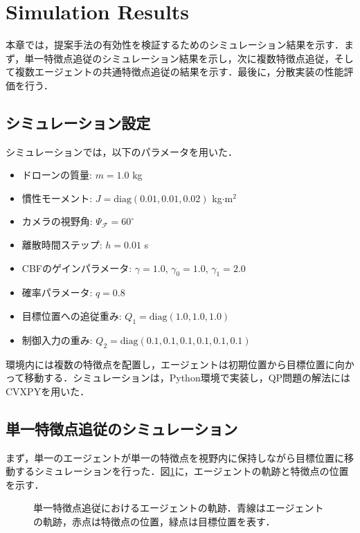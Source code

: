 \section{Simulation Results}

本章では，提案手法の有効性を検証するためのシミュレーション結果を示す．まず，単一特徴点追従のシミュレーション結果を示し，次に複数特徴点追従，そして複数エージェントの共通特徴点追従の結果を示す．最後に，分散実装の性能評価を行う．

\subsection{シミュレーション設定}

シミュレーションでは，以下のパラメータを用いた．
\begin{itemize}
    \item ドローンの質量: $m = 1.0$ kg
    \item 慣性モーメント: $J = \mathrm{diag}(0.01, 0.01, 0.02)$ kg$\cdot$m$^2$
    \item カメラの視野角: $\Psi_\mathcal{F} = 60^\circ$
    \item 離散時間ステップ: $h = 0.01$ s
    \item CBFのゲインパラメータ: $\gamma = 1.0$, $\gamma_0 = 1.0$, $\gamma_1 = 2.0$
    \item 確率パラメータ: $q = 0.8$
    \item 目標位置への追従重み: $Q_1 = \mathrm{diag}(1.0, 1.0, 1.0)$
    \item 制御入力の重み: $Q_2 = \mathrm{diag}(0.1, 0.1, 0.1, 0.1, 0.1, 0.1)$
\end{itemize}

環境内には複数の特徴点を配置し，エージェントは初期位置から目標位置に向かって移動する．シミュレーションは，Python環境で実装し，QP問題の解法にはCVXPYを用いた．

\subsection{単一特徴点追従のシミュレーション}

まず，単一のエージェントが単一の特徴点を視野内に保持しながら目標位置に移動するシミュレーションを行った．図\ref{fig:single_feature_trajectory}に，エージェントの軌跡と特徴点の位置を示す．

\begin{figure}[htbp]
    \centering
    \caption{単一特徴点追従におけるエージェントの軌跡．青線はエージェントの軌跡，赤点は特徴点の位置，緑点は目標位置を表す．}
    \label{fig:single_feature_trajectory}
\end{figure}

